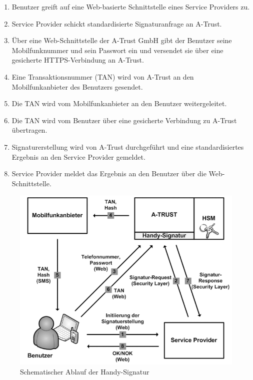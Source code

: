 \documentclass[11pt,a4paper,ngerman]{scrreprt}
\begin{document}
\begin{enumerate}
    \item Benutzer greift auf eine Web-basierte Schnittstelle eines Service Providers zu.
    \item Service Provider schickt standardisierte Signaturanfrage an A-Trust.
    \item Über eine Web-Schnittstelle der A-Trust GmbH gibt der Benutzer seine Mobilfunknummer und sein Passwort ein und versendet sie über eine gesicherte HTTPS-Verbindung an A-Trust.
    \item Eine Transaktionsnummer (TAN) wird von A-Trust an den Mobilfunkanbieter des Benutzers gesendet.
    \item Die TAN wird vom Mobilfunkanbieter an den Benutzer weitergeleitet.
    \item Die TAN wird vom Benutzer über eine gesicherte Verbindung zu A-Trust übertragen.
    \item Signaturerstellung wird von A-Trust durchgeführt und eine standardisiertes Ergebnis an den Service Provider gemeldet.
    \item Service Provider meldet das Ergebnis an den Benutzer über die Web-Schnittstelle.
\end{enumerate}
\begin{figure}[htbp]
    \centering
        \includegraphics[width=\textwidth]{Abbildungen/Ablauf_Handy-Signatur.png}
    \caption{Schematischer Ablauf der Handy-Signatur \cite[S.~3]{mobQes}}
    \label{fig:HandySignaturablauf}
\end{figure}
\end{document}

